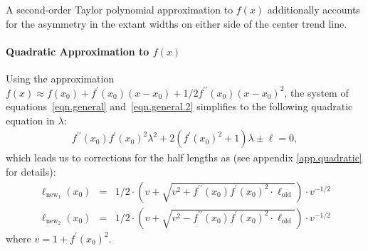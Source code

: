 \documentclass[12pt]{article}\usepackage[]{graphicx}\usepackage[]{color}
\begin{document}
A second-order Taylor polynomial approximation to $f(x)$ additionally accounts for the asymmetry in the extant widths on either side of the center trend line.

\paragraph{Quadratic Approximation to $f(x)$}\hfill\newline
%
Using the approximation $f(x) \approx f(x_0) + f^\prime(x_0)(x-x_0) + 1/2 f^{\prime\prime}(x_0)(x-x_0)^2$, the system of equations~\ref{eqn.general} and~\ref{eqn.general.2}  simplifies to the following  quadratic equation in $\lambda$:
\begin{eqnarray*}
f^{\prime\prime}(x_0)  f^\prime(x_0)^2 \lambda^2  + 2(f^\prime(x_0)^2 + 1) \lambda  \pm \ell = 0,
\end{eqnarray*}
which leads us to corrections for the half lengths as (see appendix \ref{app.quadratic} for details):
\begin{eqnarray}\label{eqn.q1}
\ell_{\text{new}_1}(x_0) &=& 1 /2 \cdot  \left(v + \sqrt{ v^2 +  f^{\prime\prime}(x_0) f^\prime(x_0)^2\cdot  \ell_{\text{old}}}\right) \cdot v^{-1/2} \\\label{eqn.q2}
\ell_{\text{new}_2}(x_0) &=& 1 /2 \cdot  \left(v + \sqrt{ v^2 -  f^{\prime\prime}(x_0) f^\prime(x_0)^2\cdot  \ell_{\text{old}}}\right) \cdot v^{-1/2} 
\end{eqnarray}
where $v = 1 + f^\prime(x_0)^2$.
\end{document}
